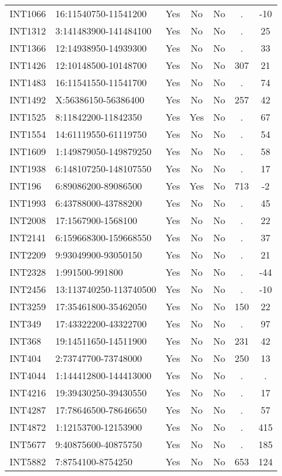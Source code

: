 \begin{longtable}{llccccc}
INT1066 & 16:11540750-11541200 & Yes & No & No & . & -10 \\
INT1312 & 3:141483900-141484100 & Yes & No & No & . & 25 \\
INT1366 & 12:14938950-14939300 & Yes & No & No & . & 33 \\
INT1426 & 12:10148500-10148700 & Yes & No & No & 307 & 21 \\
INT1483 & 16:11541550-11541700 & Yes & No & No & . & 74 \\
INT1492 & X:56386150-56386400 & Yes & No & No & 257 & 42 \\
INT1525 & 8:11842200-11842350 & Yes & Yes & No & . & 67 \\
INT1554 & 14:61119550-61119750 & Yes & No & No & . & 54 \\
INT1609 & 1:149879050-149879250 & Yes & No & No & . & 58 \\
INT1938 & 6:148107250-148107550 & Yes & No & No & . & 17 \\
INT196 & 6:89086200-89086500 & Yes & Yes & No & 713 & -2 \\
INT1993 & 6:43788000-43788200 & Yes & No & No & . & 45 \\
INT2008 & 17:1567900-1568100 & Yes & No & No & . & 22 \\
INT2141 & 6:159668300-159668550 & Yes & No & No & . & 37 \\
INT2209 & 9:93049900-93050150 & Yes & No & No & . & 21 \\
INT2328 & 1:991500-991800 & Yes & No & No & . & -44 \\
INT2456 & 13:113740250-113740500 & Yes & No & No & . & -10 \\
INT3259 & 17:35461800-35462050 & Yes & No & No & 150 & 22 \\
INT349 & 17:43322200-43322700 & Yes & No & No & . & 97 \\
INT368 & 19:14511650-14511900 & Yes & No & No & 231 & 42 \\
INT404 & 2:73747700-73748000 & Yes & No & No & 250 & 13 \\
INT4044 & 1:144412800-144413000 & Yes & No & No & . & . \\
INT4216 & 19:39430250-39430550 & Yes & No & No & . & 17 \\
INT4287 & 17:78646500-78646650 & Yes & No & No & . & 57 \\
INT4872 & 1:12153700-12153900 & Yes & No & No & . & 415 \\
INT5677 & 9:40875600-40875750 & Yes & No & No & . & 185 \\
INT5882 & 7:8754100-8754250 & Yes & No & No & 653 & 124 \\

\end{longtable}

